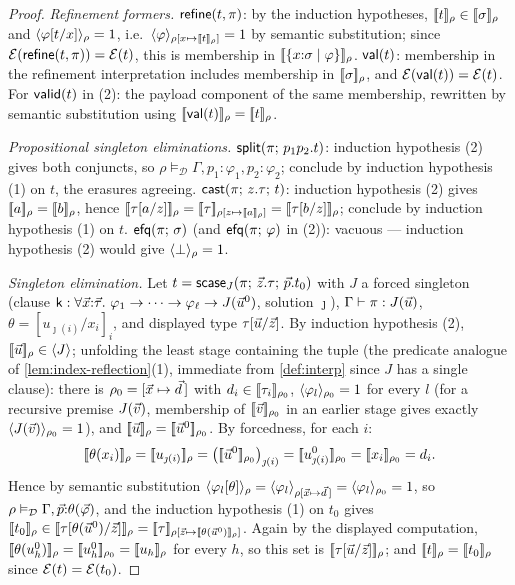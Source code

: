 \begin{proof}
\emph{Refinement formers.}  $\mathsf{refine}(t,\pi)$: by the induction
hypotheses, $[\![ t ]\!]_\rho \in [\![ \sigma ]\!]_{\rho}$ and
$\langle \varphi[t/x] \rangle_{\rho} = 1$, i.e.\
$\langle \varphi \rangle_{\rho[x \mapsto [\![ t ]\!]_\rho]} = 1$ by semantic
substitution; since $\mathcal{E}(\mathsf{refine}(t,\pi)) = \mathcal{E}(t)$, this is
membership in $[\![ \{x{:}\sigma \mid \varphi\} ]\!]_{\rho}$.  $\mathsf{val}(t)$:
membership in the refinement interpretation includes membership in
$[\![ \sigma ]\!]_{\rho}$, and $\mathcal{E}(\mathsf{val}(t)) = \mathcal{E}(t)$.  For
$\mathsf{valid}(t)$ in (2): the payload component of the same membership,
rewritten by semantic substitution using $[\![ \mathsf{val}(t) ]\!]_\rho =
[\![ t ]\!]_\rho$.

\emph{Propositional singleton eliminations.}  $\mathsf{split}(\pi;\,p_1
p_2.t)$: induction hypothesis (2) gives both conjuncts, so $\rho
\vDash_{\mathcal{D}} \Gamma, p_1{:}\varphi_1, p_2{:}\varphi_2$;
conclude by induction hypothesis (1) on $t$, the erasures agreeing.
$\mathsf{cast}(\pi;\,z.\tau;\,t)$: induction hypothesis (2) gives $[\![ a ]\!]_\rho
= [\![ b ]\!]_\rho$, hence $\semr{\subst{\tau}{a}{z}}{\rho} =
\semr{\tau}{\rho[z \mapsto \sem{a}_\rho]} =
\semr{\subst{\tau}{b}{z}}{\rho}$; conclude by induction hypothesis (1)
on $t$.  $\mathsf{efq}(\pi;\,\sigma)$ (and $\mathsf{efq}(\pi;\,\varphi)$ in
(2)): vacuous --- induction hypothesis (2) would give
$\langle \bot \rangle_{\rho} = 1$.

\emph{Singleton elimination.}  Let $t =
\mathsf{scase}_{J}(\pi;\,\vec{z}.\tau;\,\vec{p}.t_0)$ with $J$ a forced singleton
(clause $\mathsf{k} : \forall \vec{x}{:}\vec{\tau}.\ \varphi_1 \to \dots
\to \varphi_\ell \to J(\vec{u}^0)$, solution $\jmath$), $\Gamma \vdash
\pi : J(\vec{u})$, $\theta = [u_{\jmath(i)}/x_i]_i$, and displayed type
$\tau[\vec{u}/\vec{z}]$.  By induction hypothesis (2),
$[\![ \vec{u} ]\!]_\rho \in \langle J \rangle$; unfolding the least stage containing
the tuple (the predicate analogue of
\cref{lem:index-reflection}(1), immediate from \cref{def:interp} since
$J$ has a single clause): there is $\rho_0 = [\vec{x} \mapsto \vec{d}\,]$
with $d_i \in [\![ \tau_i ]\!]_{\rho_0}$, $\langle \varphi_l \rangle_{\rho_0} = 1$ for
every $l$ (for a recursive premise $J(\vec{v})$, membership of
$[\![ \vec{v} ]\!]_{\rho_0}$ in an earlier stage gives exactly
$\langle J(\vec{v}) \rangle_{\rho_0} = 1$), and $[\![ \vec{u} ]\!]_\rho =
[\![ \vec{u}^0 ]\!]_{\rho_0}$.  By forcedness, for each $i$:
\[
  \sem{\theta(x_i)}_\rho = \sem{u_{\jmath(i)}}_\rho =
  \bigl(\sem{\tup{u}^0}_{\rho_0}\bigr)_{\jmath(i)} =
  \sem{u^0_{\jmath(i)}}_{\rho_0} = \sem{x_i}_{\rho_0} = d_i .
\]
Hence by semantic substitution $\langle \varphi_l[\theta] \rangle_{\rho} =
\langle \varphi_l \rangle_{\rho[\vec{x} \mapsto \vec{d}\,]} =
\langle \varphi_l \rangle_{\rho_0} = 1$, so $\rho \vDash_{\mathcal{D}} \Gamma,
\vec{p}{:}\theta(\vec{\varphi})$, and the induction hypothesis (1) on
$t_0$ gives $\sem{t_0}_\rho \in
\semr{\tau[\theta(\tup{u}^0)/\tup{z}]}{\rho} = \semr{\tau}{\rho[\tup{z}
\mapsto \sem{\theta(\tup{u}^0)}_\rho]}$.  Again by the displayed
computation, $[\![ \theta(u^0_h) ]\!]_\rho = [\![ u^0_h ]\!]_{\rho_0} =
[\![ u_h ]\!]_\rho$ for every $h$, so this set is
$[\![ \tau[\vec{u}/\vec{z}] ]\!]_{\rho}$; and $[\![ t ]\!]_\rho =
[\![ t_0 ]\!]_\rho$ since $\mathcal{E}(t) = \mathcal{E}(t_0)$.


\end{proof}
